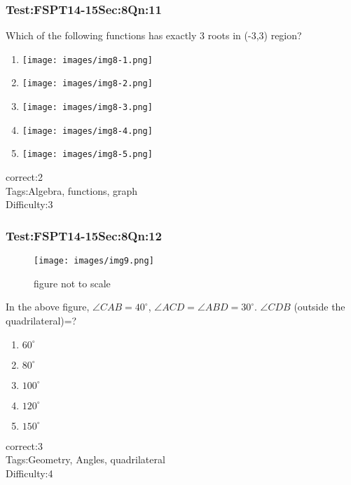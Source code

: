 \documentclass[]{beamer}
\begin{document}
    \begin{frame}
	    \frametitle{Test:FSPT14-15\hspace{2mm}Sec:8\hspace{2mm}Qn:11}
	    Which of the following functions has exactly 3 roots in (-3,3) region?
	    \begin{enumerate}
	        \item
	            \texttt{[image: images/img8-1.png]}
	        \item
	           \texttt{[image: images/img8-2.png]}
	        \item
	           \texttt{[image: images/img8-3.png]}
	        \item
	            \texttt{[image: images/img8-4.png]}
	        \item
	           \texttt{[image: images/img8-5.png]} 
	    \end{enumerate}
	    correct:2  \\   
	    Tags:Algebra, functions, graph    \\
	    Difficulty:3   \\
    \end{frame}
    \begin{frame}
	    \frametitle{Test:FSPT14-15\hspace{2mm}Sec:8\hspace{2mm}Qn:12}
	    \begin{figure}
	    \begin{center}
	    \texttt{[image: images/img9.png]}
	    \end{center}
	    {figure not to scale}
	    \end{figure}
	    In the above figure, $\angle CAB=40^\circ$, $\angle ACD=\angle ABD=30^\circ$. $\angle CDB$ (outside the quadrilateral)=?
	    \begin{enumerate}
			\item
				$60^\circ$	        
	        \item
	            $80^\circ$
	        \item
	           $100^\circ$
	        \item
	           $120^\circ$
	        \item
	           $150^\circ$	           
	    \end{enumerate}
	    correct:3  \\   
	    Tags:Geometry, Angles, quadrilateral    \\
	    Difficulty:4   \\
    \end{frame}
\end{document}
